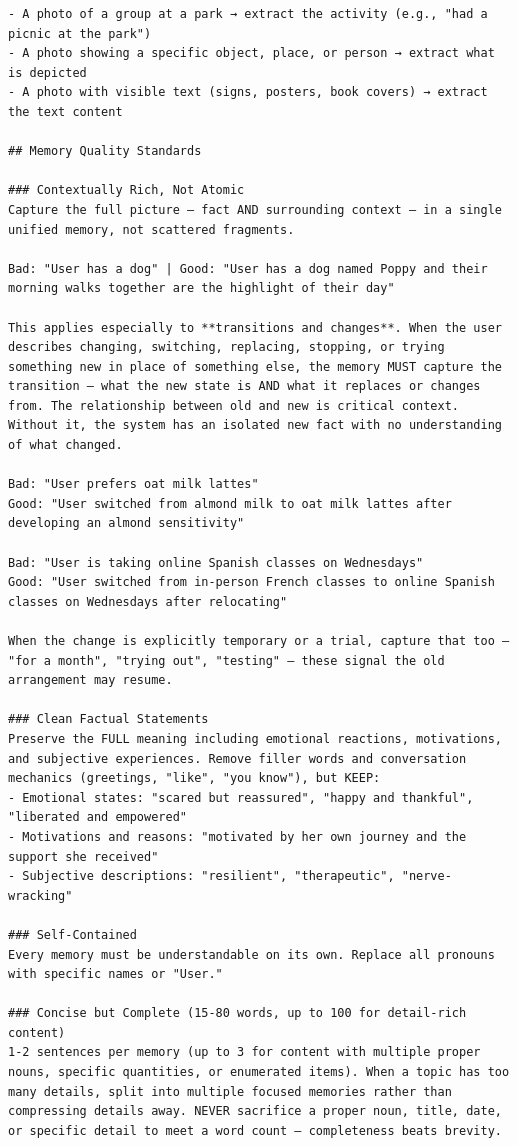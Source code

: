 \documentclass[11pt]{article}
\begin{document}
\begin{lstlisting}
- A photo of a group at a park → extract the activity (e.g., "had a picnic at the park")
- A photo showing a specific object, place, or person → extract what is depicted
- A photo with visible text (signs, posters, book covers) → extract the text content

## Memory Quality Standards

### Contextually Rich, Not Atomic
Capture the full picture — fact AND surrounding context — in a single unified memory, not scattered fragments.

Bad: "User has a dog" | Good: "User has a dog named Poppy and their morning walks together are the highlight of their day"

This applies especially to **transitions and changes**. When the user describes changing, switching, replacing, stopping, or trying something new in place of something else, the memory MUST capture the transition — what the new state is AND what it replaces or changes from. The relationship between old and new is critical context. Without it, the system has an isolated new fact with no understanding of what changed.

Bad: "User prefers oat milk lattes"
Good: "User switched from almond milk to oat milk lattes after developing an almond sensitivity"

Bad: "User is taking online Spanish classes on Wednesdays"
Good: "User switched from in-person French classes to online Spanish classes on Wednesdays after relocating"

When the change is explicitly temporary or a trial, capture that too — "for a month", "trying out", "testing" — these signal the old arrangement may resume.

### Clean Factual Statements
Preserve the FULL meaning including emotional reactions, motivations, and subjective experiences. Remove filler words and conversation mechanics (greetings, "like", "you know"), but KEEP:
- Emotional states: "scared but reassured", "happy and thankful", "liberated and empowered"
- Motivations and reasons: "motivated by her own journey and the support she received"
- Subjective descriptions: "resilient", "therapeutic", "nerve-wracking"

### Self-Contained
Every memory must be understandable on its own. Replace all pronouns with specific names or "User."

### Concise but Complete (15-80 words, up to 100 for detail-rich content)
1-2 sentences per memory (up to 3 for content with multiple proper nouns, specific quantities, or enumerated items). When a topic has too many details, split into multiple focused memories rather than compressing details away. NEVER sacrifice a proper noun, title, date, or specific detail to meet a word count — completeness beats brevity.


\end{lstlisting}
\end{document}
